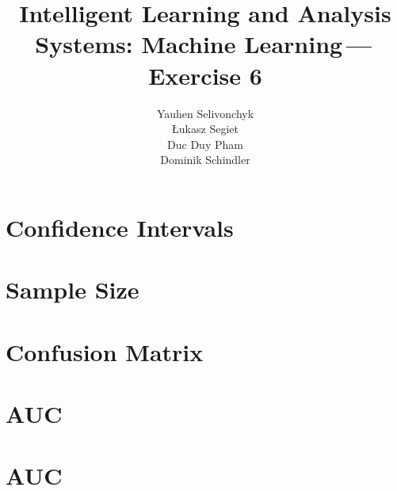 \documentclass[a4paper]{article}
\newcommand{\exnumber}{6}
\begin{document}
\title{Intelligent Learning and Analysis Systems: Machine Learning\,---\,Exercise \exnumber}
\author{Yauhen Selivonchyk\\ {\L}ukasz Segiet\\Duc Duy Pham\\Dominik Schindler}

\maketitle

\section{Confidence Intervals}



\section{Sample Size}


\section{Confusion Matrix}


\section{AUC}




\section{AUC}

\end{document}
